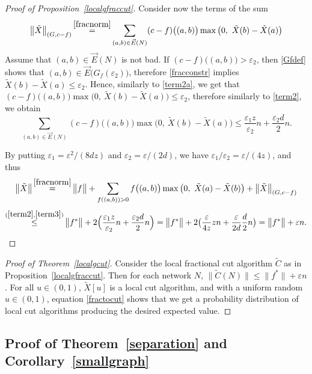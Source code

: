 \documentclass[12pt,a4paper]{article}
\newcommand{\eps}{\varepsilon}
\newcommand{\vE}{\vec{E}}
\renewcommand{\:}{\colon}
\begin{document}
\begin{proof}[Proof of Proposition~\ref{localgfraccut}]
Consider now the terms of the sum
\begin{equation} \label{term3a}
\big\| \tilde{X} \big\|_{(G, c-f)} \mathop{=}^{\eqref{fracnorm}} \sum_{(a, b) \in \vE(N)} (c - f)\big((a, b)\big) \max\big(0,\ \tilde{X}(b) - \tilde{X}(a)\big)
\end{equation}
Assume that $(a, b) \in \vE(N)$ is not bad. If $(c-f)\big((a, b)\big) > \eps_2$, then \eqref{Gfdef} shows that $(a, b) \in \vE\big(G_f(\eps_2)\big)$, therefore \eqref{fracconstr} implies $\tilde{X}(b) - \tilde{X}(a) \le \eps_2$. Hence, similarly to \eqref{term2a}, we get that $(c - f)\big((a, b)\big) \max\big(0,\ \tilde{X}(b) - \tilde{X}(a)\big) \le \eps_2$, therefore similarly to \eqref{term2}, we obtain
\begin{equation} \label{term3}
\sum_{(a, b) \in \vE(N)} (c - f)\big((a, b)\big) \max\big(0,\ \tilde{X}(b) - \tilde{X}(a)\big) \le \frac{\eps_1 z}{\eps_2} n + \frac{\eps_2 d}{2} n.
\end{equation}

By putting $\eps_1 = \eps^2 / (8dz)$ and $\eps_2 = \eps / (2d)$, we have $\eps_1/\eps_2 = \eps/(4z)$, and thus 
\begin{equation*}
\big\| \tilde{X} \big\| \mathop{=}^{\eqref{fracnorm}} \big\| f \big\| + \sum_{f((a, b)) > 0} f\big((a, b)\big) \max\big(0,\ \tilde{X}(a) - \tilde{X}(b)\big) + \big\| \tilde{X} \big\|_{(G, c - f)}
\end{equation*}
\begin{equation*}
\mathop{\le}^{(\ref{term2},\ref{term3})} \big\| f^* \big\| + 2 \Big( \frac{\eps_1 z}{\eps_2} n + \frac{\eps_2 d}{2} n \Big) = \big\| f^* \big\| + 2 \big( \frac{\eps}{4z}zn + \frac{\eps}{2d}\frac{d}{2}n \big) = \big\| f^* \big\| + \eps n. \qedhere
\end{equation*}
\end{proof}


\begin{proof}[Proof of Theorem~\ref{localgcut}]
Consider the local fractional cut algorithm $\tilde{C}$ as in Proposition~\ref{localgfraccut}. 
Then for each network $N$, $\big\| \tilde{C}(N) \big\| \le \big\|f^*\big\| + \eps n$. 
For all $u \in (0, 1)$, $\tilde{X}[u]$ is a local cut algorithm, and with a uniform random $u \in (0, 1)$, equation \eqref{fractocut} shows that we get a probability distribution of local cut algorithms producing the desired expected value.
\end{proof}


\subsection{Proof of Theorem~\ref{separation} and Corollary~\ref{smallgraph}}\label{subs:pumping}
\end{document}
